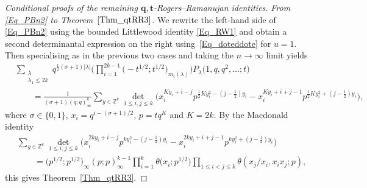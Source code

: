 \documentclass[pdftex]{sigma}
\numberwithin{equation}{section}
\renewcommand{\leq}{\leqslant}
\newcommand{\abs}[1]{\vert#1\vert}
\newcommand{\la}{\lambda}
\begin{document}
\begin{proof}[Conditional proofs of the remaining $\boldsymbol{q,t}$-Rogers--Ramanujan
identities]
\textit{From \eqref{Eq_PBn2} to Theorem~$\ref{Thm_qtRR3}$.}
We rewrite the left-hand side of \eqref{Eq_PBn2} using the bounded
Littlewood identity \eqref{Eq_RW1} and obtain a
second determinantal expression on the right using~\eqref{Eq_doteddote} for $u=1$.
Then specialising as in the previous two cases and taking the
$n\to\infty$ limit yields
\begin{align*}
&\sum_{\substack{\la \\[1pt] \la_1\leq 2k}}
q^{\frac{1}{2}(\sigma+1)\abs{\la}}
\Biggl(\prod_{i=1}^{2k-1}\bigl({-}t^{1/2};t^{1/2}\bigr)_{m_i(\la)}\Biggr)
P_{\la}\bigl(1,q,q^2,\dots;t\bigr) \\
&\qquad = \frac{1}{(\sigma+1)(q;q)_{\infty}^k} \sum_{y\in\mathbb{Z}^k}
\det_{1\leq i,j\leq k}\bigl(
x_i^{Ky_i+i-j} p^{\frac{1}{2}Ky_i^2-(j-\frac{1}{2})y_i}-
x_i^{Ky_i+i+j-1} p^{\frac{1}{2}Ky_i^2+(j-\frac{1}{2})y_i}\bigr),
\end{align*}
where $\sigma\in\{0,1\}$, $x_i=q^{i-(\sigma+1)/2}$, $p=tq^K$ and
$K=2k$.
By the  Macdonald identity \cite{Macdonald72}
\begin{align*}
&\sum_{y\in\mathbb{Z}^k}
\det_{1\leq i,j\leq k}\bigl(
x_i^{2ky_i+i-j} p^{ky_i^2-(j-\frac{1}{2})y_i}
-x_i^{2ky_i+i+j-1} p^{ky_i^2+(j-\frac{1}{2})y_i}\bigr) \\
&\qquad=\bigl(p^{1/2};p^{1/2}\bigr)_{\infty}(p;p)_{\infty}^{k-1}
\prod_{i=1}^k \theta\bigl(x_i;p^{1/2}\bigr)
\prod_{1\leq i<j\leq k} \theta(x_j/x_i,x_ix_j;p),
\end{align*}
this gives Theorem~\ref{Thm_qtRR3}.


\end{proof}
\end{document}
